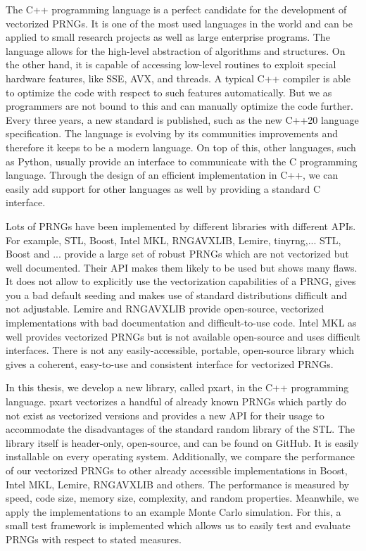 \documentclass{stdlocal}
\begin{document}
The C++ programming language is a perfect candidate for the development of vectorized PRNGs.
It is one of the most used languages in the world and can be applied to small research projects as well as large enterprise programs.
The language allows for the high-level abstraction of algorithms and structures.
On the other hand, it is capable of accessing low-level routines to exploit special hardware features, like SSE, AVX, and threads.
A typical C++ compiler is able to optimize the code with respect to such features automatically.
But we as programmers are not bound to this and can manually optimize the code further.
Every three years, a new standard is published, such as the new C++20 language specification.
The language is evolving by its communities improvements and therefore it keeps to be a modern language.
On top of this, other languages, such as Python, usually provide an interface to communicate with the C programming language.
Through the design of an efficient implementation in C++, we can easily add support for other languages as well by providing a standard C interface.

Lots of PRNGs have been implemented by different libraries with different APIs.
For example, STL, Boost, Intel MKL, RNGAVXLIB, Lemire, tinyrng,...
STL, Boost and ... provide a large set of robust PRNGs which are not vectorized but well documented.
Their API makes them likely to be used but shows many flaws.
It does not allow to explicitly use the vectorization capabilities of a PRNG, gives you a bad default seeding and makes use of standard distributions difficult and not adjustable.
Lemire and RNGAVXLIB provide open-source, vectorized implementations with bad documentation and difficult-to-use code.
Intel MKL as well provides vectorized PRNGs but is not available open-source and uses difficult interfaces.
There is not any easily-accessible, portable, open-source library which gives a coherent, easy-to-use and consistent interface for vectorized PRNGs.

In this thesis, we develop a new library, called pxart, in the C++ programming language.
pxart vectorizes a handful of already known PRNGs which partly do not exist as vectorized versions and provides a new API for their usage to accommodate the disadvantages of the standard random library of the STL.
The library itself is header-only, open-source, and can be found on GitHub.
It is easily installable on every operating system.
Additionally, we compare the performance of our vectorized PRNGs to other already accessible implementations in Boost, Intel MKL, Lemire, RNGAVXLIB and others.
The performance is measured by speed, code size, memory size, complexity, and random properties.
Meanwhile, we apply the implementations to an example Monte Carlo simulation.
For this, a small test framework is implemented which allows us to easily test and evaluate PRNGs with respect to stated measures.

\end{document}
